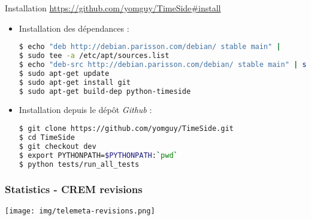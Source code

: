 \documentclass[10pt, final, hyperref, table]{beamer}
\begin{document}
\begin{frame}[fragile]
  \begin{block}{Installation}
\url{https://github.com/yomguy/TimeSide\#install}
    \begin{itemize}
    \item Installation des dépendances :
\begin{lstlisting}[language=bash, basicstyle=\tiny]
$ echo "deb http://debian.parisson.com/debian/ stable main" |
$ sudo tee -a /etc/apt/sources.list 
$ echo "deb-src http://debian.parisson.com/debian/ stable main" | sudo tee -a /etc/apt/sources.list 
$ sudo apt-get update 
$ sudo apt-get install git 
$ sudo apt-get build-dep python-timeside
\end{lstlisting}

    \item Installation depuis le dépôt \emph{Github} :
\begin{lstlisting}[language=bash, basicstyle=\tiny]
$ git clone https://github.com/yomguy/TimeSide.git 
$ cd TimeSide 
$ git checkout dev 
$ export PYTHONPATH=$PYTHONPATH:`pwd` 
$ python tests/run_all_tests
\end{lstlisting}
\end{itemize}
\end{block}
\end{frame}

\begin{frame}
  \frametitle{Statistics - CREM revisions}
  \begin{center}
    \texttt{[image: img/telemeta-revisions.png]}
  \end{center}
\end{frame}
\end{document}

